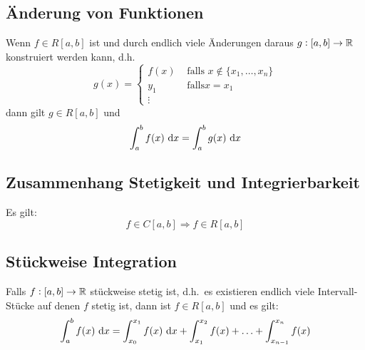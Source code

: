 \subsection{Änderung von Funktionen}
Wenn $f \in R[a, b]$ ist und durch endlich viele Änderungen daraus
$g: [a,b] \rightarrow \mathbb{R}$ konstruiert werden kann, d.h.
\begin{equation*}
    g(x) =
    \begin{cases}
        f(x) &\text{ falls } x \notin \{x_1, \ldots, x_n \} \\
        y_1 &\text{ falls} x=x_1\\
        \vdots
    \end{cases}
\end{equation*}
dann gilt $g \in R[a, b]$ und
\begin{equation*}
    \int_a^b f(x) \text{ d}x = \int_a^b g(x) \text{ d}x
\end{equation*}

\subsection{Zusammenhang Stetigkeit und Integrierbarkeit}
Es gilt:
\begin{equation*}
    f \in C[a, b] \Rightarrow f \in R[a, b]
\end{equation*}

\subsection{Stückweise Integration}
Falls $f: [a, b] \rightarrow \mathbb{R}$ stückweise stetig ist, d.h.\ es existieren
endlich viele Intervall-Stücke auf denen $f$ stetig ist, dann ist
$f \in R[a,b]$ und es gilt:
\begin{equation*}
    \int_a^b f(x) \text{ d}x = \int_{x_0}^{x_1} f(x) \text{ d}x + \int_{x_1}^{x_2} f(x)
    + \ldots + \int_{x_{n-1}}^{x_n} f(x)
\end{equation*}
